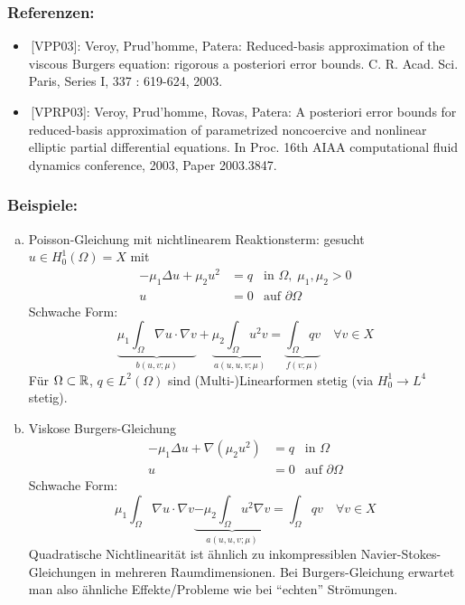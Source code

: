 \subsubsection*{Referenzen:}
\begin{itemize}
	\item \,[VPP03]: Veroy, Prud'homme, Patera: Reduced-basis approximation of the viscous Burgers equation: rigorous a posteriori error bounds. C. R. Acad. Sci. Paris, Series I, 337 : 619-624, 2003.
	\item \,[VPRP03]: Veroy, Prud'homme, Rovas, Patera: A posteriori error bounds for reduced-basis approximation of parametrized noncoercive and nonlinear elliptic partial differential equations. In Proc. 16th AIAA computational fluid dynamics conference, 2003, Paper 2003.3847.
\end{itemize}

\subsubsection*{Beispiele:}
\begin{enumerate}[a)]
	\item Poisson-Gleichung mit nichtlinearem Reaktionsterm: gesucht $u \in H_0^1(\Omega) = X$ mit
		\begin{align*}
			-\mu_1 \Delta u + \mu_2 u^2 &= q &\text{in } \Omega,\; \mu_1, \mu_2 > 0\\
			u &= 0 & \text{auf } \partial\Omega
		\end{align*}
		Schwache Form:
		\[
			\underbrace{\mu_1 \int_\Omega \nabla u \cdot \nabla v}_{b(u,v;\mu)} + \underbrace{\mu_2 \int_\Omega u^2 v}_{a(u,u,v;\mu)} = \underbrace{\int_\Omega q v}_{f(v;\mu)} \quad \forall v \in X
		\]
		Für $\Omega \subset \mathbb{R}$, $q \in L^2(\Omega)$ sind (Multi-)Linearformen stetig (via $H_0^1 \to L^4$ stetig).
	\item Viskose Burgers-Gleichung
		\begin{align*}
			-\mu_1 \Delta u + \nabla(\mu_2 u^2) &= q &\text{in } \Omega\\
			u &= 0 & \text{auf } \partial\Omega
		\end{align*}
		Schwache Form:
		\[
			\mu_1 \int_\Omega \nabla u \cdot \nabla v \underbrace{- \mu_2 \int_\Omega u^2 \nabla v}_{a(u,u,v;\mu)} = \int_\Omega q v \quad \forall v \in X
		\]
		Quadratische Nichtlinearität ist ähnlich zu inkompressiblen Navier-Stokes-Gleichungen in mehreren Raumdimensionen.
		Bei Burgers-Gleichung erwartet man also ähnliche Effekte/Probleme wie bei ``echten'' Strömungen.
\end{enumerate}

